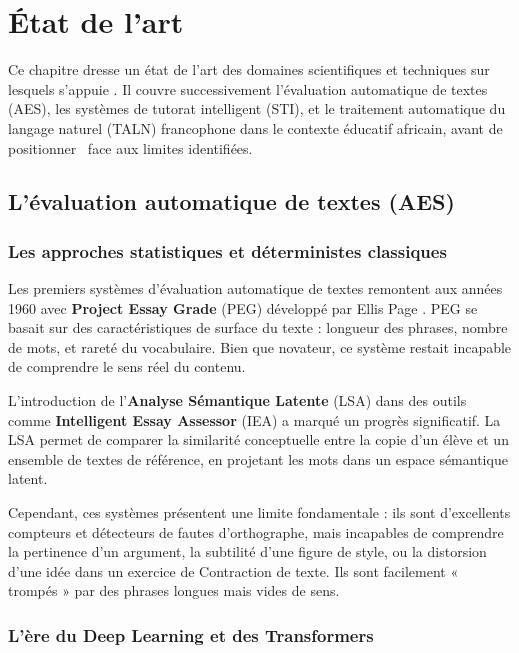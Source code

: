 \chapter{État de l'art}
\label{ch:etat_art}

Ce chapitre dresse un état de l'art des domaines scientifiques et techniques sur lesquels s'appuie \AZIZA. Il couvre successivement l'évaluation automatique de textes (AES), les systèmes de tutorat intelligent (STI), et le traitement automatique du langage naturel (TALN) francophone dans le contexte éducatif africain, avant de positionner \AZIZA\ face aux limites identifiées.

\section{L'évaluation automatique de textes (AES)}

\subsection{Les approches statistiques et déterministes classiques}

Les premiers systèmes d'évaluation automatique de textes remontent aux années 1960 avec \textbf{Project Essay Grade} (PEG) développé par Ellis Page \cite{page1966}. PEG se basait sur des caractéristiques de surface du texte : longueur des phrases, nombre de mots, et rareté du vocabulaire. Bien que novateur, ce système restait incapable de comprendre le sens réel du contenu.

L'introduction de l'\textbf{Analyse Sémantique Latente} (LSA) dans des outils comme \textbf{Intelligent Essay Assessor} (IEA) \cite{landauer1997} a marqué un progrès significatif. La LSA permet de comparer la similarité conceptuelle entre la copie d'un élève et un ensemble de textes de référence, en projetant les mots dans un espace sémantique latent.

Cependant, ces systèmes présentent une limite fondamentale : ils sont d'excellents compteurs et détecteurs de fautes d'orthographe, mais incapables de comprendre la pertinence d'un argument, la subtilité d'une figure de style, ou la distorsion d'une idée dans un exercice de Contraction de texte. Ils sont facilement « trompés » par des phrases longues mais vides de sens.

\subsection{L'ère du Deep Learning et des Transformers}

